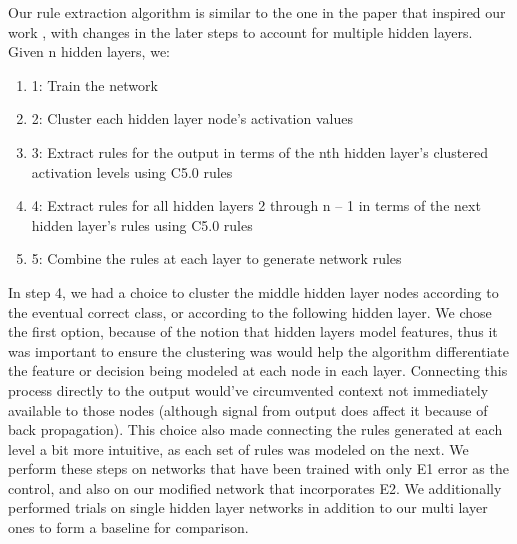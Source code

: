 Our rule extraction algorithm is similar to the one in the paper that inspired our work \cite{thuan11}, with changes in the later steps to account for multiple hidden layers. Given n hidden layers, we:
\begin{enumerate}
\item
1: Train the network
\item
2: Cluster each hidden layer node’s activation values 
\item
3: Extract rules for the output in terms of the nth hidden layer’s clustered activation levels using C5.0 rules
\item
4: Extract rules for all hidden layers 2 through n – 1 in terms of the next hidden layer’s rules using C5.0 rules
\item
5: Combine the rules at each layer to generate network rules
\end{enumerate}
In step 4, we had a choice to cluster the middle hidden layer nodes according to the eventual correct class, or according to the following hidden layer. We chose the first option, because of the notion that hidden layers model features, thus it was important to ensure the clustering was would help the algorithm differentiate the feature or decision being modeled at each node in each layer. Connecting this process directly to the output would’ve circumvented context not immediately available to those nodes (although signal from output does affect it because of back propagation). This choice also made connecting the rules generated at each level a bit more intuitive, as each set of rules was modeled on the next. We perform these steps on networks that have been trained with only E1 error as the control, and also on our modified network that incorporates E2. We additionally performed trials on single hidden layer networks in addition to our multi layer ones to form a baseline for comparison. 


